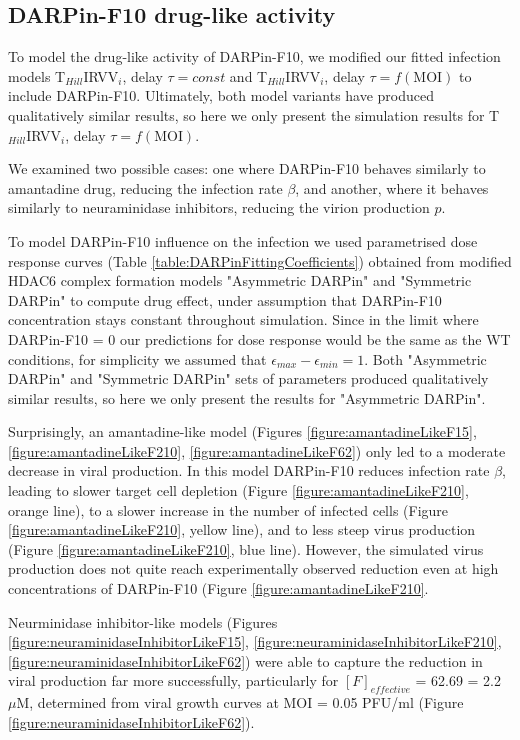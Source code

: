 \subsection{DARPin-F10 drug-like activity}

To model the drug-like activity of DARPin-F10, we modified our fitted infection models T$_{Hill}$IRVV$_i$, delay $\tau = const$ and T$_{Hill}$IRVV$_i$, delay $\tau = f(\text{MOI})$ to include DARPin-F10. Ultimately, both model variants have produced qualitatively similar results, so here we only present the simulation results for T$_{Hill}$IRVV$_i$, delay $\tau = f(\text{MOI})$.

We examined two possible cases: one where DARPin-F10 behaves similarly to amantadine drug, reducing the infection rate $\beta$, and another, where it behaves similarly to neuraminidase inhibitors, reducing the virion production $p$.

To model DARPin-F10 influence on the infection we used parametrised dose response curves (Table \ref{table:DARPinFittingCoefficients}) obtained from modified HDAC6 complex formation models "Asymmetric DARPin" and "Symmetric DARPin" to compute drug effect, under assumption that DARPin-F10 concentration stays constant throughout simulation. Since in the limit where DARPin-F10 = 0 our predictions for dose response would be the same as the WT conditions, for simplicity we assumed that $\epsilon_{max} - \epsilon_{min} = 1$. Both "Asymmetric DARPin" and "Symmetric DARPin"  sets of parameters produced qualitatively similar results, so here we only present the results for "Asymmetric DARPin".

Surprisingly, an amantadine-like model (Figures \ref{figure:amantadineLikeF15}, \ref{figure:amantadineLikeF210}, \ref{figure:amantadineLikeF62}) only led to a moderate decrease in viral production. In this model DARPin-F10 reduces infection rate $\beta$, leading to slower target cell depletion (Figure \ref{figure:amantadineLikeF210}, orange line), to a slower increase in the number of infected cells (Figure \ref{figure:amantadineLikeF210}, yellow line), and to less steep virus production (Figure \ref{figure:amantadineLikeF210}, blue line). However, the simulated virus production does not quite reach experimentally observed reduction even at high concentrations of DARPin-F10 (Figure \ref{figure:amantadineLikeF210}.

Neurminidase inhibitor-like models (Figures \ref{figure:neuraminidaseInhibitorLikeF15}, \ref{figure:neuraminidaseInhibitorLikeF210}, \ref{figure:neuraminidaseInhibitorLikeF62}) were able to capture the reduction in viral production far more successfully, particularly for $[F]_{effective}$ = 62.69 = 2.2 $\mu$M, determined from viral growth curves at MOI = 0.05 PFU/ml (Figure \ref{figure:neuraminidaseInhibitorLikeF62}).

